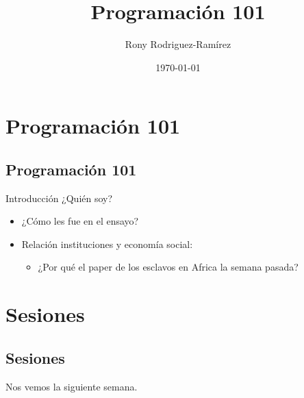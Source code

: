 \documentclass[11pt, aspectratio=169, compress]{beamer}
\title{Programación 101}
\author{Rony Rodriguez-Ramírez}
\institute{LAMBDA}
\date{\today}
\makeatletter
\def\beamer@writeslidentry@miniframesoff{%
	\expandafter\beamer@ifempty\expandafter{\beamer@framestartpage}{}%
	{%
		\clearpage\beamer@notesactions%
	}
}
\newcommand*{\miniframesoff}{\let\beamer@writeslidentry=\beamer@writeslidentry@miniframesoff}
\makeatother
\begin{document}
	
\begin{frame}[plain]
	\maketitle 
\end{frame}

\section{Programación 101}
\subsection{Programación 101}
\begin{frame}{Introducción}
	¿Quién soy? 
	\begin{itemize}
		\item ¿Cómo les fue en el ensayo? 
		\item Relación instituciones y economía social: 
		\begin{itemize}
			\item ¿Por qué el paper de los esclavos en Africa la semana pasada? 
		\end{itemize}
	\end{itemize}
\end{frame}
\section{Sesiones}
\subsection{Sesiones}

\miniframesoff 	
\begin{frame}
Nos vemos la siguiente semana. 
\end{frame}
\end{document}
